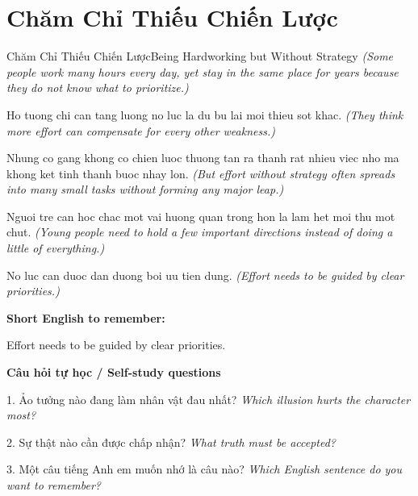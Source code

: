 \section{Chăm Chỉ Thiếu Chiến Lược}
\begin{truyen}{Chăm Chỉ Thiếu Chiến Lược}{Being Hardworking but Without Strategy}
\textit{(Some people work many hours every day, yet stay in the same place for years because they do not know what to prioritize.)}

Ho tuong chi can tang luong no luc la du bu lai moi thieu sot khac.
\textit{(They think more effort can compensate for every other weakness.)}

Nhung co gang khong co chien luoc thuong tan ra thanh rat nhieu viec nho ma khong ket tinh thanh buoc nhay lon.
\textit{(But effort without strategy often spreads into many small tasks without forming any major leap.)}

Nguoi tre can hoc chac mot vai huong quan trong hon la lam het moi thu mot chut.
\textit{(Young people need to hold a few important directions instead of doing a little of everything.)}

\end{truyen}

\begin{baihoc}
No luc can duoc dan duong boi uu tien dung.
\textit{(Effort needs to be guided by clear priorities.)}
\end{baihoc}

\begin{ghinhoanh}
\textbf{Short English to remember:}

Effort needs to be guided by clear priorities.

\end{ghinhoanh}

\begin{tuhocnhanh}
\textbf{Câu hỏi tự học / Self-study questions}

1. Ảo tưởng nào đang làm nhân vật đau nhất? \textit{Which illusion hurts the character most?}

2. Sự thật nào cần được chấp nhận? \textit{What truth must be accepted?}

3. Một câu tiếng Anh em muốn nhớ là câu nào? \textit{Which English sentence do you want to remember?}
\end{tuhocnhanh}
\ngancach

